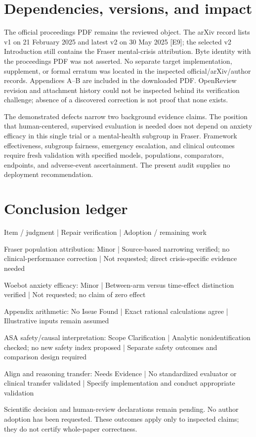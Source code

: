 \documentclass[10pt]{article}
\begin{document}
\section*{Dependencies, versions, and impact}
The official proceedings PDF remains the reviewed object. The arXiv record lists v1 on 21 February 2025 and latest v2 on 30 May 2025 [E9]; the selected v2 Introduction still contains the Fraser mental-crisis attribution. Byte identity with the proceedings PDF was not asserted. No separate target implementation, supplement, or formal erratum was located in the inspected official/arXiv/author records. Appendices A–B are included in the downloaded PDF. OpenReview revision and attachment history could not be inspected behind its verification challenge; absence of a discovered correction is not proof that none exists.\par
The demonstrated defects narrow two background evidence claims. The position that human-centered, supervised evaluation is needed does not depend on anxiety efficacy in this single trial or a mental-health subgroup in Fraser. Framework effectiveness, subgroup fairness, emergency escalation, and clinical outcomes require fresh validation with specified models, populations, comparators, endpoints, and adverse-event ascertainment. The present audit supplies no deployment recommendation.\par
\section*{Conclusion ledger}
Item / judgment | Repair verification | Adoption / remaining work\par
Fraser population attribution: Minor | Source-based narrowing verified; no clinical-performance correction | Not requested; direct crisis-specific evidence needed\par
Woebot anxiety efficacy: Minor | Between-arm versus time-effect distinction verified | Not requested; no claim of zero effect\par
Appendix arithmetic: No Issue Found | Exact rational calculations agree | Illustrative inputs remain assumed\par
ASA safety/causal interpretation: Scope Clarification | Analytic nonidentification checked; no new safety index proposed | Separate safety outcomes and comparison design required\par
Align and reasoning transfer: Needs Evidence | No standardized evaluator or clinical transfer validated | Specify implementation and conduct appropriate validation\par
Scientific decision and human-review declarations remain pending. No author adoption has been requested. These outcomes apply only to inspected claims; they do not certify whole-paper correctness.\par
\end{document}
